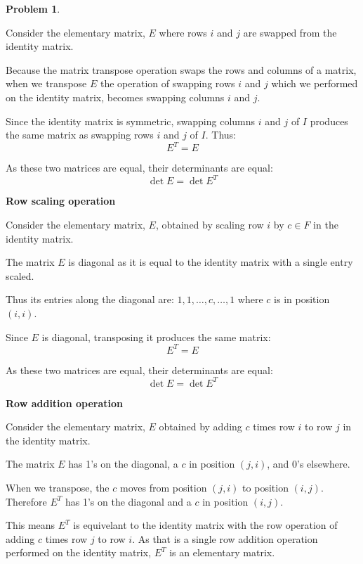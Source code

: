 \documentclass[12pt, oneside]{amsart}
\theoremstyle{definition}
\newtheorem{prob}{Problem}
\begin{document}
\begin{prob}
\begin{enumerate}
\begin{solution}
    Consider the elementary matrix, $E$ where rows $i$ and $j$ are swapped from the identity matrix.
    
    Because the matrix transpose operation swaps the rows and columns of a matrix, when we transpose $E$ the operation of swapping rows $i$ and $j$ which we performed on the identity matrix, becomes swapping columns $i$ and $j$.
    
    Since the identity matrix is symmetric, swapping columns $i$ and $j$ of $I$ produces the same matrix as swapping rows $i$ and $j$ of $I$. Thus:
    \[
      E^T = E
    \]

    As these two matrices are equal, their determinants are equal:
    \[
    \det E = \det E^T
    \]
    
    \vspace{0.3cm}
    
    \textbf{Row scaling operation}
    
    Consider the elementary matrix, $E$, obtained by scaling row $i$ by $c \in F$ in the identity matrix.
    
    The matrix $E$ is diagonal as it is equal to the identity matrix with a single entry scaled. 

    Thus its entries along the diagonal are: $1, 1, \ldots, c, \ldots, 1$ where $c$ is in position $(i,i)$.
    
    Since $E$ is diagonal, transposing it produces the same matrix:
    \[
      E^T = E
    \]
    
    As these two matrices are equal, their determinants are equal:
    \[
    \det E = \det E^T
    \]
    
    \vspace{0.3cm}
    
    \textbf{Row addition operation}
    
    Consider the elementary matrix, $E$ obtained by adding $c$ times row $i$ to row $j$ in the identity matrix.
    
    The matrix $E$ has 1's on the diagonal, a $c$ in position $(j, i)$, and 0's elsewhere.
    
    When we transpose, the $c$ moves from position $(j, i)$ to position $(i, j)$. Therefore $E^T$ has 1's on the diagonal and a $c$ in position $(i, j)$.
    
    This means $E^T$ is equivelant to the identity matrix with the row operation of adding $c$ times row $j$ to row $i$. As that is a single row addition operation performed on the identity matrix, $E^T$ is an elementary matrix.
    

\end{solution}
\end{enumerate}
\end{prob}
\end{document}
